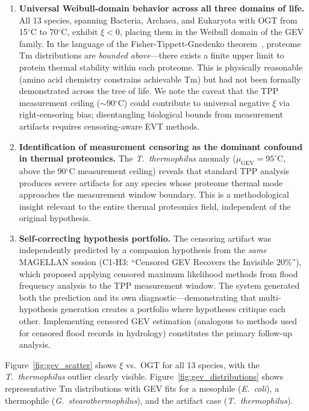\begin{enumerate}
    \item \textbf{Universal Weibull-domain behavior across all three domains of life.} All 13 species, spanning Bacteria, Archaea, and Eukaryota with OGT from 15$^\circ$C to 70$^\circ$C, exhibit $\xi < 0$, placing them in the Weibull domain of the GEV family. In the language of the Fisher-Tippett-Gnedenko theorem~\citep{fisher1928,gnedenko1943}, proteome Tm distributions are \emph{bounded above}---there exists a finite upper limit to protein thermal stability within each proteome. This is physically reasonable (amino acid chemistry constrains achievable Tm) but had not been formally demonstrated across the tree of life. We note the caveat that the TPP measurement ceiling ($\sim$90$^\circ$C) could contribute to universal negative $\xi$ via right-censoring bias; disentangling biological bounds from measurement artifacts requires censoring-aware EVT methods.
    \item \textbf{Identification of measurement censoring as the dominant confound in thermal proteomics.} The \textit{T.\ thermophilus} anomaly ($\mu_\text{GEV} = 95^\circ$C, above the 90$^\circ$C measurement ceiling) reveals that standard TPP analysis produces severe artifacts for any species whose proteome thermal mode approaches the measurement window boundary. This is a methodological insight relevant to the entire thermal proteomics field, independent of the original hypothesis.
    \item \textbf{Self-correcting hypothesis portfolio.} The censoring artifact was independently predicted by a companion hypothesis from the \emph{same} MAGELLAN session (C1-H3: ``Censored GEV Recovers the Invisible 20\%''), which proposed applying censored maximum likelihood methods from flood frequency analysis to the TPP measurement window. The system generated both the prediction and its own diagnostic---demonstrating that multi-hypothesis generation creates a portfolio where hypotheses critique each other. Implementing censored GEV estimation (analogous to methods used for censored flood records in hydrology) constitutes the primary follow-up analysis.
\end{enumerate}

Figure~\ref{fig:gev_scatter} shows $\xi$ vs.\ OGT for all 13 species, with the \textit{T.\ thermophilus} outlier clearly visible. Figure~\ref{fig:gev_distributions} shows representative Tm distributions with GEV fits for a mesophile (\textit{E.\ coli}), a thermophile (\textit{G.\ stearothermophilus}), and the artifact case (\textit{T.\ thermophilus}).


